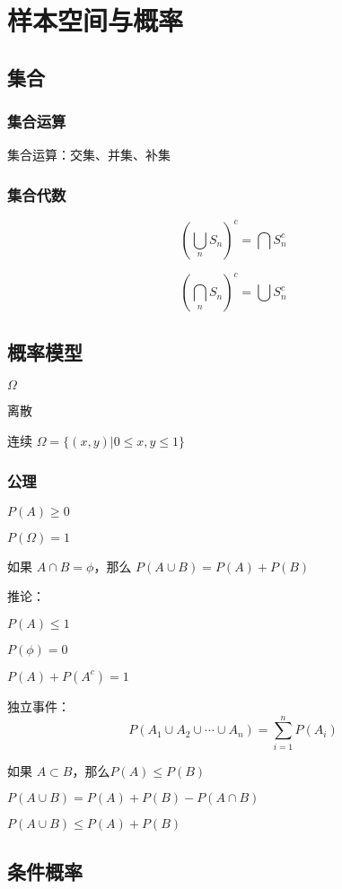 \chapter{样本空间与概率}

\section{集合}

\subsection{集合运算}

集合运算：交集、并集、补集

\subsection{集合代数}


$$(\bigcup_n S_n)^c = \bigcap S_n^c$$ 

$$(\bigcap_n S_n)^c = \bigcup S_n^c$$ 

\section{概率模型}

 $\Omega$

离散

连续 $\Omega = \{(x,y) | 0 \leq x, y \leq 1 \}$ 

\subsection{公理}
 

 \begin{ol}
   \item $P(A) \geq 0$
   \item $P(\Omega) = 1$
   \item 如果 $A \cap B = \phi$，那么 $P(A \cup B) = P(A) + P(B)$
 \end{ol}

 推论：

\begin{ul}
  \item $P(A) \leq 1$
  \item $P(\phi) = 0$
  \item $P(A) + P(A^c) = 1$
  \item 独立事件：$$P(A_1 \cup A_2 \cup \cdots \cup A_n) = \sum_{i=1}^n P(A_i)$$
  \item 如果 $A \subset B$，那么$P(A) \leq P(B)$
  \item $P(A \cup B) = P(A) + P(B) - P(A \cap B)$
  \item $P(A \cup B) \leq P(A) + P(B)$
\end{ul}


\section{条件概率}